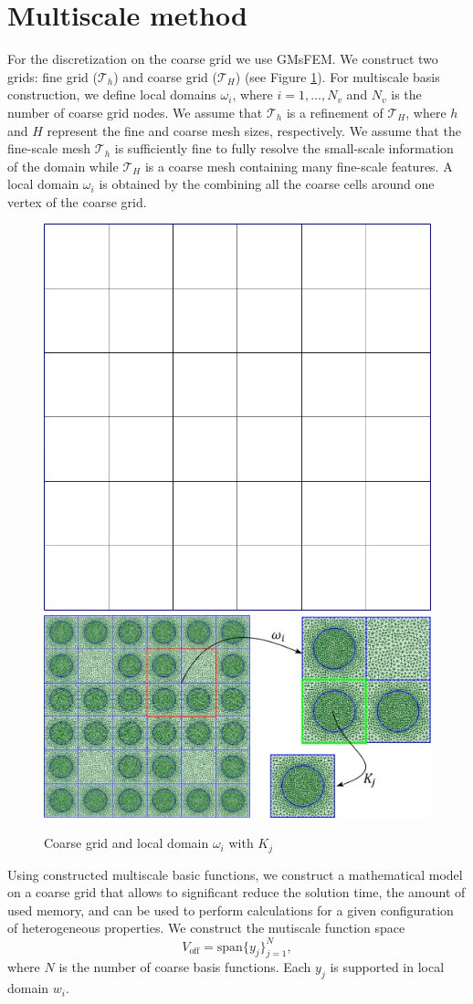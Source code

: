 \documentclass[runningheads]{llncs}
\begin{document}
\section{Multiscale method}
For the discretization on the coarse grid we use GMsFEM.
We construct two grids: fine grid ($\mathcal{T}_h$) and coarse grid ($\mathcal{T}_H$) (see Figure \ref{p1}). 
For multiscale basis construction, we define local domains $\omega_i$, where $i = 1,...,N_v$ and $N_v$ is the number of coarse grid nodes.
We assume that $\mathcal{T}_h$ is a refinement of $\mathcal{T}_H$, where $h$ and $H$ represent the fine and coarse mesh sizes, respectively. 
We assume that the fine-scale mesh $\mathcal{T}_h$ is sufficiently fine to fully resolve the small-scale information of the domain  while $\mathcal{T}_H$ is a coarse mesh containing many fine-scale features.
A local domain $\omega_i$ is obtained by the combining all the coarse cells around one vertex of the coarse grid. 

\begin{figure}[h!]
\centering
\includegraphics[width=0.26\linewidth]{coarse_grid.png}
\hspace{2em}
\includegraphics[width=0.5\linewidth]{omega.png} 
\caption{Coarse grid and local domain $\omega_i$ with $K_j$}
\label{p1}
\end{figure} 

Using constructed multiscale basic functions, we construct a mathematical model on a coarse grid that allows to significant reduce the solution time, the amount of used memory, and can be used to perform calculations for a given configuration of  heterogeneous properties. 
We construct the mutiscale function space
\[
{V}_{\text{off}} = \mbox{span} \{ y_j \}_{j=1}^{N},
\]
where $N$ is the number of coarse basis functions.
Each $y_j$ is supported in local domain $w_i$.
\end{document}
